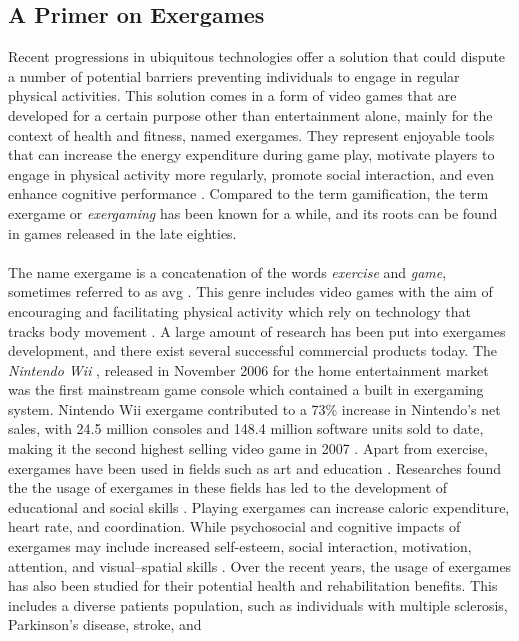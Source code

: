 \subsection{A Primer on Exergames}
Recent progressions in ubiquitous technologies offer a solution that could dispute a number of potential barriers preventing individuals to engage in regular physical activities. This solution comes in a form of video games that are developed for a certain purpose other than entertainment alone, mainly for the context of health and fitness, named exergames. They represent enjoyable tools that can increase the energy expenditure during game play, motivate players to engage in physical activity more regularly, promote social interaction, and even enhance cognitive performance \cite{staiano2011exergames}. Compared to the term gamification, the term exergame or \textit{exergaming} has been known for a while, and its roots can be found in games released in the late eighties. \\\\The name exergame is a concatenation of the words \textit{exercise} and \textit{game}, sometimes referred to as \acrfull{avg}  \cite{altamimi2012survey}. This genre includes video games with the aim of encouraging and facilitating physical activity which rely on technology that tracks body movement  \cite{altamimi2012survey}. A large amount of research has been put into exergames development, and there exist several successful commercial
products today. The \textit{Nintendo Wii} \cite{wii}, released in November 2006 for the home entertainment market was the first mainstream game console which contained a built in exergaming system. Nintendo Wii exergame contributed to a 73\% increase in Nintendo's net sales, with 24.5 million consoles and 148.4 million software units sold to date, making it the second highest selling video game in 2007 \cite{staiano2011exergames}. Apart from exercise, exergames have been used in fields such as art and education \cite{altamimi2012survey}. Researches found the the usage of exergames in these fields has led to the 
development of educational and social skills \cite{altamimi2012survey}. Playing exergames can increase caloric expenditure, heart rate, and coordination. While psychosocial and cognitive impacts of exergames may include increased self-esteem, social interaction, motivation, attention, and visual–spatial skills \cite{staiano2011exergames}. Over the recent years, the usage of exergames has also been studied for their potential health and rehabilitation benefits. This includes a diverse patients population, such as individuals with multiple sclerosis, Parkinson’s disease, stroke, and

